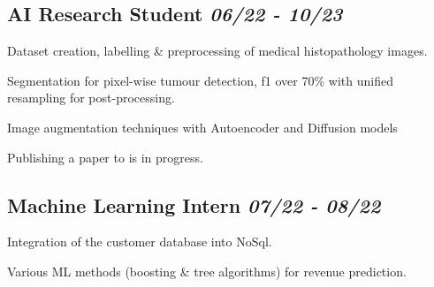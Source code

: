 \documentclass[letter, 14pt]{article}
\begin{document}
\subsection{AI Research Student \hfill \textit{\textmd{ 06/22 - 10/23}}}
\begin{zitemize}
\item Dataset creation, labelling \& preprocessing of medical histopathology images.
\item Segmentation for pixel-wise tumour detection, f1 over 70\% with unified resampling for post-processing.
\item Image augmentation techniques with Autoencoder and Diffusion models
\item Publishing a paper to \href{https://www.jidonline.org/}{\color{black}{JID Q1}} is in progress.
\end{zitemize}


\subsection{Machine Learning Intern \hfill \textit{\textmd{ 07/22 - 08/22}}}
\begin{zitemize}
\item Integration of the customer database into NoSql.
\item Various ML methods (boosting \& tree algorithms) for revenue prediction.
\end{zitemize}

\end{document}
